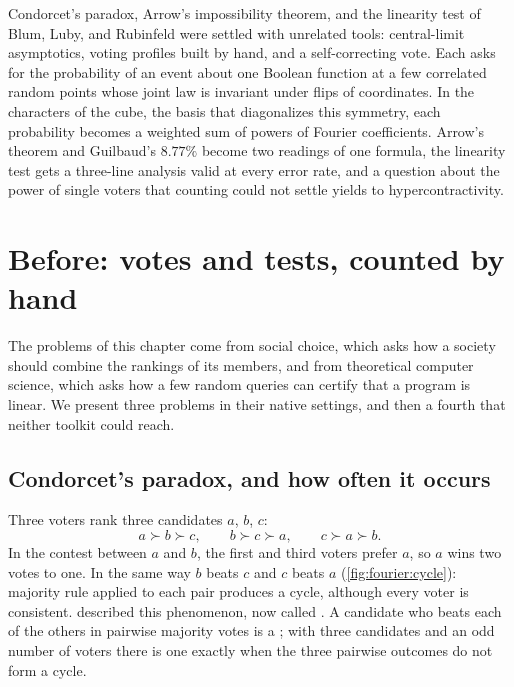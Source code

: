 \newcommand{\fourierStab}{\operatorname{Stab}}
\newcommand{\fourierInf}{\operatorname{Inf}}
\newcommand{\fourierTI}{\mathbf{I}}
\newcommand{\fourierMaj}{\operatorname{Maj}}
\newcommand{\fourierW}[1]{\mathrm{W}^{#1}}
\newcommand{\fourierLin}{\mathrm{Lin}}
\newcommand{\fourierOnes}{\mathbf{1}}

\begin{refsection}

\begin{chaptersummary}
Condorcet's paradox, Arrow's impossibility theorem, and the linearity test of Blum, Luby, and Rubinfeld were settled with unrelated tools: central-limit asymptotics, voting profiles built by hand, and a self-correcting vote. Each asks for the probability of an event about one Boolean function at a few correlated random points whose joint law is invariant under flips of coordinates. In the characters of the cube, the basis that diagonalizes this symmetry, each probability becomes a weighted sum of powers of Fourier coefficients. Arrow's theorem and Guilbaud's $8.77\%$ become two readings of one formula, the linearity test gets a three-line analysis valid at every error rate, and a question about the power of single voters that counting could not settle yields to hypercontractivity.
\end{chaptersummary}

\section{Before: votes and tests, counted by hand}\label{sec:fourier:before}

The problems of this chapter come from social choice, which asks how a society should combine the rankings of its members, and from theoretical computer science, which asks how a few random queries can certify that a program is linear. We present three problems in their native settings, and then a fourth that neither toolkit could reach.

\subsection{Condorcet's paradox, and how often it occurs}\label{sec:fourier:condorcet}

Three voters rank three candidates $a$, $b$, $c$:
\[
  a\succ b\succ c,\qquad b\succ c\succ a,\qquad c\succ a\succ b .
\]
In the contest between $a$ and $b$, the first and third voters prefer $a$, so $a$ wins two votes to one. In the same way $b$ beats $c$ and $c$ beats $a$ (\cref{fig:fourier:cycle}): majority rule applied to each pair produces a cycle, although every voter is consistent. \Textcite{Condorcet1785} described this phenomenon, now called . A candidate who beats each of the others in pairwise majority votes is a ; with three candidates and an odd number of voters there is one exactly when the three pairwise outcomes do not form a cycle.


\end{refsection}
